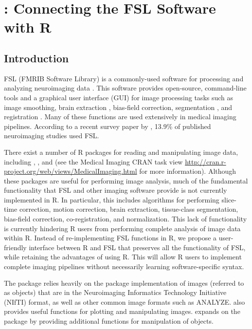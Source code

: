 \chapter{: Connecting the FSL Software with R}
\section{Introduction}
\label{sec:intro}

FSL (FMRIB Software Library) is a commonly-used software for processing and analyzing neuroimaging data \citep{jenkinson_fsl_2012}.  This software provides open-source, command-line tools and a graphical user interface (GUI) for image processing tasks such as image smoothing, brain extraction \citep{smith_fast_2002}, bias-field correction, segmentation \citep{zhang_segmentation_2001}, and registration \citep{jenkinson_global_2001, jenkinson_improved_2002}.    Many of these functions are used extensively in medical imaging pipelines.   According to a recent survey paper by \citet{carp_secret_2012}, 13.9\% of published neuroimaging studies used FSL.

There exist a number of R packages for reading and manipulating image data, including  \citep{bordier_temporal_2011},  \citep{modat_rniftyreg:_2013}, and  \citep{tabelow_statistical_2011} (see the Medical Imaging CRAN task view \url{http://cran.r-project.org/web/views/MedicalImaging.html} for more information).  Although these packages are useful for performing image analysis, much of the fundamental functionality that FSL and other imaging software provide is not currently implemented in R.  In particular, this includes algorithms for performing slice-time correction, motion correction, brain extraction, tissue-class segmentation, bias-field correction, co-registration, and normalization. This lack of functionality is currently hindering R users from performing complete analysis of image data within R.  Instead of re-implementing FSL functions in R, we propose a user-friendly interface between R and FSL that preserves all the functionality of FSL, while retaining the advantages of using R.  This will allow
R users to implement complete imaging pipelines without necessarily learning software-specific syntax.  

The  package relies heavily on the  \citep{whitcher_working_2011} package implementation of images (referred to as  objects) that are in the Neuroimaging Informatics Technology Initiative (NIfTI) format, as well as other common image formats such as ANALYZE.   also provides useful functions for plotting and manipulating images.   expands on the  package by providing additional functions for manipulation of  objects.


